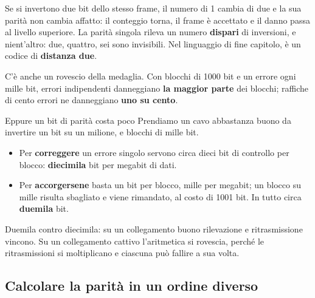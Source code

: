 Se si invertono due bit dello stesso frame, il numero di 1 cambia di due e la sua parità non cambia affatto: il conteggio torna,
il frame è accettato e il danno passa al livello superiore. La parità singola rileva un numero \textbf{dispari} di inversioni, e
nient'altro: due, quattro, sei sono invisibili. Nel linguaggio di fine capitolo, è un codice di \textbf{distanza due}.


C'è anche un rovescio della medaglia. Con blocchi di 1000 bit e un errore ogni mille bit, errori indipendenti danneggiano
\textbf{la maggior parte} dei blocchi; raffiche di cento errori ne danneggiano \textbf{uno su cento}.

\begin{esempio}{Eppure un bit di parità costa poco}
Prendiamo un cavo abbastanza buono da invertire un bit su un milione, e blocchi di mille bit.
\begin{itemize}
    \item Per \textbf{correggere} un errore singolo servono circa dieci bit di controllo per blocco: \textbf{diecimila} bit per
          megabit di dati.
    \item Per \textbf{accorgersene} basta un bit per blocco, mille per megabit; un blocco su mille risulta sbagliato e viene
          rimandato, al costo di 1001 bit. In tutto circa \textbf{duemila} bit.
\end{itemize}
Duemila contro diecimila: su un collegamento buono rilevazione e ritrasmissione vincono. Su un collegamento cattivo l'aritmetica
si rovescia, perché le ritrasmissioni si moltiplicano e ciascuna può fallire a sua volta.
\end{esempio}

\subsection{Calcolare la parità in un ordine diverso}


